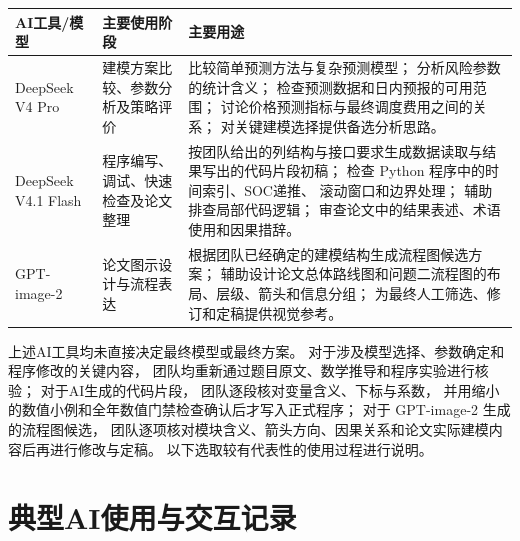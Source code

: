 \documentclass[UTF8,a4paper,11pt]{ctexart}
\begin{document}
\begin{center}
\small
\begin{tabularx}{\textwidth}{
    L{0.22\textwidth}
    L{0.24\textwidth}
    Y
}
\toprule
\textbf{AI工具/模型} &
\textbf{主要使用阶段} &
\textbf{主要用途} \\
\midrule
DeepSeek V4 Pro &
建模方案比较、参数分析及策略评价 &
比较简单预测方法与复杂预测模型；
分析风险参数的统计含义；
检查预测数据和日内预报的可用范围；
讨论价格预测指标与最终调度费用之间的关系；
对关键建模选择提供备选分析思路。 \\
DeepSeek V4.1 Flash &
程序编写、调试、快速检查及论文整理 &
按团队给出的列结构与接口要求生成数据读取与结果写出的代码片段初稿；
检查 Python 程序中的时间索引、SOC递推、
滚动窗口和边界处理；
辅助排查局部代码逻辑；
审查论文中的结果表述、术语使用和因果措辞。 \\
GPT-image-2 &
论文图示设计与流程表达 &
根据团队已经确定的建模结构生成流程图候选方案；
辅助设计论文总体路线图和问题二流程图的布局、层级、箭头和信息分组；
为最终人工筛选、修订和定稿提供视觉参考。 \\
\bottomrule
\end{tabularx}
\end{center}

上述AI工具均未直接决定最终模型或最终方案。
对于涉及模型选择、参数确定和程序修改的关键内容，
团队均重新通过题目原文、数学推导和程序实验进行核验；
对于AI生成的代码片段，
团队逐段核对变量含义、下标与系数，
并用缩小的数值小例和全年数值门禁检查确认后才写入正式程序；
对于 GPT-image-2 生成的流程图候选，
团队逐项核对模块含义、箭头方向、因果关系和论文实际建模内容后再进行修改与定稿。
以下选取较有代表性的使用过程进行说明。

\section{典型AI使用与交互记录}
\end{document}
